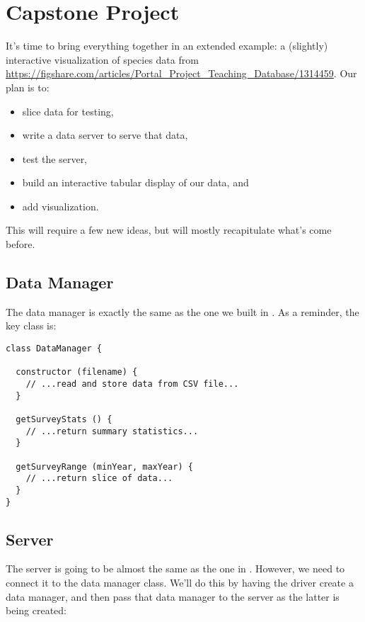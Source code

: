 \chapter{Capstone Project}\label{s:capstone}

It's time to bring everything together in an extended example:
a (slightly) interactive visualization of species data from
\url{https://figshare.com/articles/Portal_Project_Teaching_Database/1314459}.
Our plan is to:

\begin{itemize}
\item
  slice data for testing,
\item
  write a data server to serve that data,
\item
  test the server,
\item
  build an interactive tabular display of our data, and
\item
  add visualization.
\end{itemize}

\noindent
This will require a few new ideas,
but will mostly recapitulate what's come before.

\section{Data Manager}\label{s:capstone-data}

The data manager is exactly the same as the one we built in .
As a reminder,
the key class is:

\begin{verbatim}
class DataManager {

  constructor (filename) {
    // ...read and store data from CSV file...
  }

  getSurveyStats () {
    // ...return summary statistics...
  }

  getSurveyRange (minYear, maxYear) {
    // ...return slice of data...
  }
}
\end{verbatim}

\section{Server}\label{s:capstone-server}

The server is going to be almost the same as the one in .
However, we need to connect it to the data manager class.
We'll do this by having the driver create a data manager,
and then pass that data manager to the server as the latter is being created:

